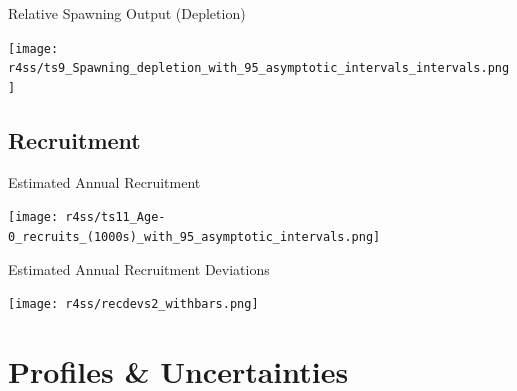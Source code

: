\documentclass[pdf]{beamer}\usepackage[]{graphicx}\usepackage[]{color}
\begin{document}
\begin{frame}{Relative Spawning Output (Depletion)}
  \begin{center}
    \texttt{[image: r4ss/ts9\_Spawning\_depletion\_with\_95\_asymptotic\_intervals\_intervals.png]}
  \end{center}
\end{frame}

\subsection{Recruitment}
\begin{frame}{Estimated Annual Recruitment}
  \begin{center}
    \texttt{[image: r4ss/ts11\_Age-0\_recruits\_(1000s)\_with\_95\_asymptotic\_intervals.png]}
  \end{center}
\end{frame}

\begin{frame}{Estimated Annual Recruitment Deviations}
  \begin{center}
    \texttt{[image: r4ss/recdevs2\_withbars.png]}
  \end{center}
\end{frame}

\section{Profiles \& Uncertainties}
\end{document}
